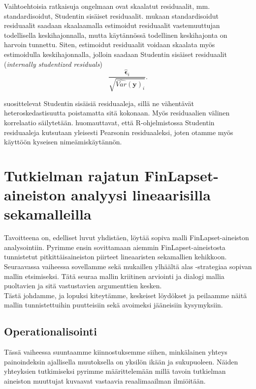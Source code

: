 \documentclass[finnish]{docopts}
\begin{document}
 Vaihtoehtoisia ratkaisuja ongelmaan ovat skaalatut residuaalit, mm. standardisoidut, Studentin sisäiset residuaalit. \cite{burzykowski13} mukaan standardisoidut residuaalit saadaan skaalaamalla estimoidut residuaalit vastemuuttujan todellisella keskihajonnalla, mutta käytännössä todellinen keskihajonta on harvoin tunnettu. Siten, estimoidut residuaalit voidaan skaalata myös estimoidulla keskihajonnalla, jolloin saadaan Studentin sisäiset residuaalit (\textit{internally studentized residuals})\\
 
 $$
 \frac{\hat{\bm{\epsilon}}_i}{\sqrt{\widehat{Var}(\bm{y})_i}}.
 $$
 
 \cite{burzykowski13} suosittelevat Studentin sisäisiä residuaaleja, sillä ne vähentävät heteroskedastisuutta poistamatta sitä kokonaan. Myös residuaalien välinen korrelaatio säilytetään. \cite{burzykowski13} huomauttavat, että R-ohjelmistossa Studentin residuaaleja kutsutaan yleisesti Pearsonin residuaaleksi, joten otamme myös käyttöön kyseisen nimeämiskäytännön.\\
 
\section{Tutkielman rajatun FinLapset-aineiston analyysi lineaarisilla sekamalleilla}
\label{sec:lsmanalyysi}

Tavoitteena on, edelliset luvut yhdistäen, löytää sopiva malli FinLapset-aineiston analysointiin. Pyrimme ensin sovittamaan aiemmin FinLapset-aineistosta tunnistetut pitkittäisaineiston piirteet lineaaristen sekamallien kehikkoon.\\

Seuraavassa vaiheessa sovellamme \cite{west14} sekä \cite{verbeke00} mukaillen ylhäältä alas -strategiaa sopivan mallin etsimiseksi. Tätä seuraa mallin kriitinen arviointi ja dialogi mallia puoltavien ja sitä vastustavien argumenttien kesken.\\

Tästä johdamme, ja lopuksi kiteytämme, keskeiset löydökset ja peilaamme näitä mallin tunnistettuihin puutteisiin sekä avoimeksi jääneisiin kysymyksiin.\\

\subsection{Operationalisointi}
\label{sub:operationalisointi}

Tässä vaiheessa suuntaamme kiinnostuksemme siihen, minkälainen yhteys painoindeksin ajallisella muutoksella on yksilön ikään ja sukupuoleen. Näiden yhteyksien tutkimiseksi pyrimme määrittelemään millä tavoin tutkielman aineiston muuttujat kuvaavat vastaavia reaalimaailman ilmiöitään.\\
\end{document}
